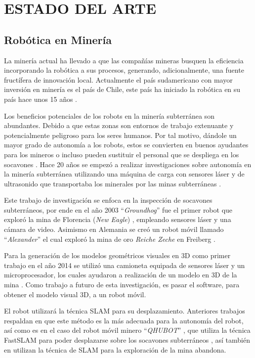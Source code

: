 \chapter{ESTADO DEL ARTE}

\section{Rob\'otica en Miner\'ia}
La minería actual ha llevado a que las compañías mineras busquen la eficiencia 
incorporando la robótica a sus procesos, generando, adicionalmente, una fuente 
fructífera de innovación local. Actualmente el país sudamericano con mayor inversión 
en minería es el país de Chile, este país ha iniciado la robótica en su país hace 
unos 15 años \cite{Carmona2014}.

Los beneficios potenciales de los robots en la minería subterránea son abundantes. Debido 
a que estas zonas son entornos de trabajo extenuante y potencialmente peligroso para 
los seres humanos. Por tal motivo, dándole un mayor grado de autonomía a los robots, estos 
se convierten en buenos ayudantes para los mineros o incluso pueden sustituir el personal 
que se despliega en los socavones \cite{Carmona2014}. Hace 20 años se empezó a realizar 
investigaciones sobre autonomía en la minería subterránea utilizando una máquina de carga 
con sensores láser y de ultrasonido que transportaba los minerales por las minas 
subterráneas \cite{Scheding1999}. 

Este trabajo  de investigación  se enfoca en la inspección de socavones subterráneos, por 
ende en el año 2003 “\textit{Groundhog}” fue el primer robot que exploró la mina de 
Florencia (\textit{New Eagle}) \cite{Thrun2004}, empleando sensores láser y una cámara de 
video. Asimismo en Alemania se creó un robot móvil llamado “\textit{Alexander}” el cual 
exploró la mina de oro \textit{Reiche Zeche} en Freiberg \cite{Grehl2015}.

Para la generación de los modelos geométricos visuales en 3D como primer trabajo en el 
año 2014 se utilizó una camioneta equipada de sensores láser y un microprocesador, los 
cuales ayudaron a realización de un modelo en 3D de la mina \cite{Zlot2014}. Como trabajo 
a futuro de esta investigación, es pasar el software, para obtener el modelo visual 3D, 
a un robot móvil.
 
El robot utilizará la técnica SLAM para su desplazamiento. Anteriores trabajos 
respaldan en que este método es la más adecuada para la autonomía del robot, así como es 
en el caso del robot móvil minero “\textit{QHUBOT}” , que utiliza la técnica FastSLAM para 
poder desplazarse sobre los socavones subterráneos \cite{Mauricio2015}, así también 
en \cite{Thrun2004} utilizan la técnica de SLAM para la exploración de la mina abandona. 

